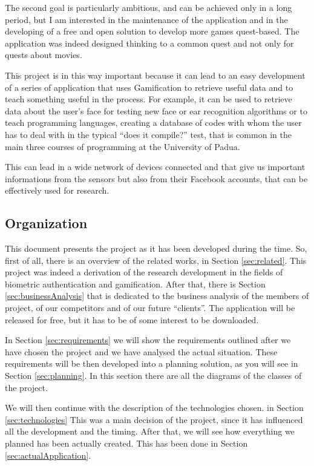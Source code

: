 The second goal is particularly ambitious, and can be achieved only in a long period, but I am interested in the maintenance of the application and in the developing of a free and open solution to develop more games quest-based. The application was indeed designed thinking to a common quest and not only for quests about movies.

This project is in this way important because it can lead to an easy development of a series of application that uses Gamification to retrieve useful data and to teach something useful in the process. For example, it can be used to retrieve data about the user's face for testing new face or ear recognition algorithms or to teach programming languages, creating a database of codes with whom the user has to deal with in the typical ``does it compile?'' test, that is common in the main three courses of programming at the University of Padua.

This can lead in a wide network of devices connected and that give us important informations from the sensors but also from their Facebook accounts, that can be effectively used for research.

\subsection{Organization}
This document presents the project as it has been developed during the time. So, first of all, there is an overview of the related works, in Section \ref{sec:related}. This project was indeed a derivation of the research development in the fields of biometric authentication and gamification. After that, there is Section \ref{sec:businessAnalysis} that is dedicated to the business analysis of the members of project, of our competitors and of our future ``clients''. The application will be released for free, but it has to be of some interest to be downloaded.

In Section \ref{sec:requirements} we will show the requirements outlined after we have chosen the project and we have analysed the actual situation. These requirements will be then developed into a planning solution, as you will see in Section \ref{sec:planning}. In this section there are all the diagrams of the classes of the project.

We will then continue with the description of the technologies chosen. in Section \ref{sec:technologies} This was a main decision of the project, since it has influenced all the development and the timing. After that, we will see how everything we planned has been actually created. This has been done in Section \ref{sec:actualApplication}.

